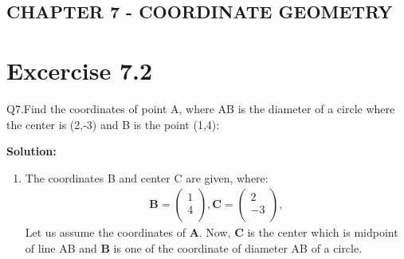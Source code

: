 \documentclass[12pt]{article}
\newcommand{\solution}{\noindent \textbf{Solution: }}
\newcommand{\myvec}[1]{\ensuremath{\begin{pmatrix}#1\end{pmatrix}}}
\let\vec\mathbf
\begin{document}
\begin{center}
\section*{CHAPTER 7 - COORDINATE GEOMETRY}

\end{center}
\section*{Excercise 7.2}

Q7.Find the coordinates of point A, where AB is the diameter of a circle where the center is (2,-3) and B is the point (1,4):

\solution
\begin{enumerate}
\item The coordinates B and center C are given, where:
	\begin{align}
	\vec{B} = \myvec{
		1\\
	    4\\
		},
	\vec{C} = \myvec{
	    2\\
	   -3\\
		},
	\end{align}
Let us assume the coordinates of $\vec{A}$. Now, $\vec{C}$ is the center which is midpoint of line AB and $\vec{B}$ is one of the coordinate of diameter AB of a circle.
		

\end{enumerate}
\end{document}
